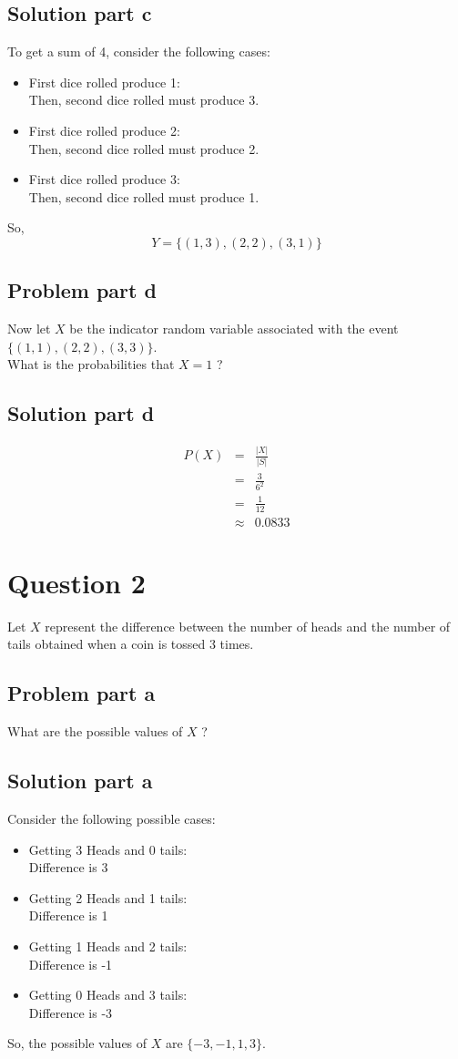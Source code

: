 \documentclass[12pt]{article}%
\newcommand\abs[1]{\left|#1\right|}
\begin{document}
\subsection*{Solution part c}
To get a sum of 4, consider the following cases:
\begin{itemize}
\item First dice rolled produce 1: \\
Then, second dice rolled must produce 3.
\item First dice rolled produce 2: \\
Then, second dice rolled must produce 2.
\item First dice rolled produce 3: \\
Then, second dice rolled must produce 1.
\end{itemize}
So, \\
\begin{equation*}
Y = \{(1,3), (2,2), (3,1)\}
\end{equation*}
\subsection*{Problem part d}
Now let $X$ be the indicator random variable associated with the event $\{(1, 1), (2, 2), (3, 3)\}$. \\
What is the probabilities that $X = 1$ ?
\subsection*{Solution part d}
\begin{eqnarray*}
P(X) & = & \frac{\abs{X}}{\abs{S}} \\
 	 & = & \frac{3}{6^2} \\
 	 & = & \frac{1}{12} \\
 	 & \approx & 0.0833
\end{eqnarray*}
\newpage
\section*{Question 2}
Let $X$ represent the difference between the number of heads and the number of tails obtained when a coin is tossed 3 times.
\subsection*{Problem part a}
What are the possible values of $X$ ?
\subsection*{Solution part a}
Consider the following possible cases:
\begin{itemize}
\item Getting 3 Heads and 0 tails: \\
Difference is 3
\item Getting 2 Heads and 1 tails: \\
Difference is 1
\item Getting 1 Heads and 2 tails: \\
Difference is -1
\item Getting 0 Heads and 3 tails: \\
Difference is -3
\end{itemize} 
So, the possible values of $X$ are $\{-3,-1,1,3\}$.
\end{document}
